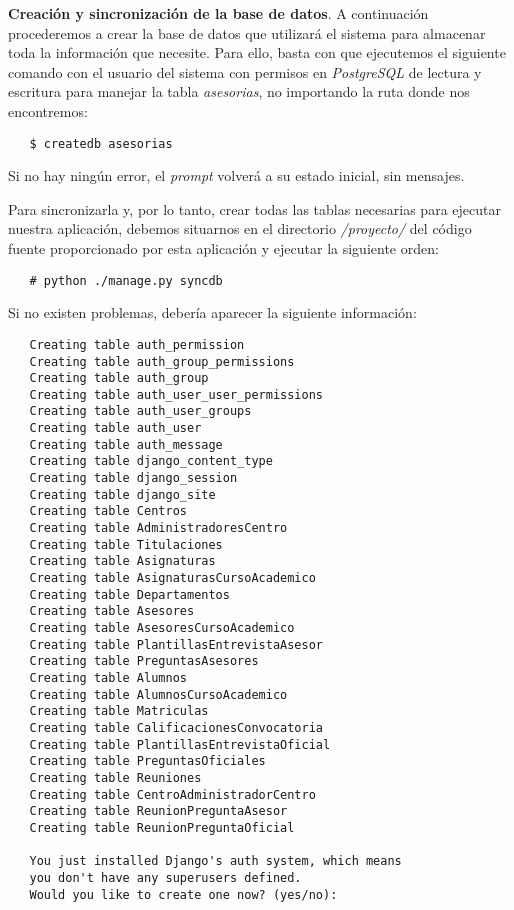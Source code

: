 \item \textbf{Creación y sincronización de la base de datos}.
   A continuación procederemos a crear la base de datos que utilizará el sistema
   para almacenar toda la información que necesite. Para ello, basta con que
   ejecutemos el siguiente comando con el usuario del sistema con permisos en
   \textit{PostgreSQL} de lectura y escritura para manejar la tabla
   \textit{asesorias}, no importando la ruta donde nos encontremos:

   \begin{verbatim}
   $ createdb asesorias
   \end{verbatim}

   Si no hay ningún error, el \textit{prompt} volverá a su estado inicial,
   sin mensajes.

   Para sincronizarla y, por lo tanto, crear todas las tablas necesarias para
   ejecutar nuestra aplicación, debemos situarnos en el directorio
   \textit{/proyecto/} del código fuente proporcionado por esta aplicación
   y ejecutar la siguiente orden:

   \begin{verbatim}
   # python ./manage.py syncdb
   \end{verbatim}

   Si no existen problemas, debería aparecer la siguiente información:

   \begin{verbatim}
   Creating table auth_permission
   Creating table auth_group_permissions
   Creating table auth_group
   Creating table auth_user_user_permissions
   Creating table auth_user_groups
   Creating table auth_user
   Creating table auth_message
   Creating table django_content_type
   Creating table django_session
   Creating table django_site
   Creating table Centros
   Creating table AdministradoresCentro
   Creating table Titulaciones
   Creating table Asignaturas
   Creating table AsignaturasCursoAcademico
   Creating table Departamentos
   Creating table Asesores
   Creating table AsesoresCursoAcademico
   Creating table PlantillasEntrevistaAsesor
   Creating table PreguntasAsesores
   Creating table Alumnos
   Creating table AlumnosCursoAcademico
   Creating table Matriculas
   Creating table CalificacionesConvocatoria
   Creating table PlantillasEntrevistaOficial
   Creating table PreguntasOficiales
   Creating table Reuniones
   Creating table CentroAdministradorCentro
   Creating table ReunionPreguntaAsesor
   Creating table ReunionPreguntaOficial

   You just installed Django's auth system, which means
   you don't have any superusers defined.
   Would you like to create one now? (yes/no):
   \end{verbatim}

